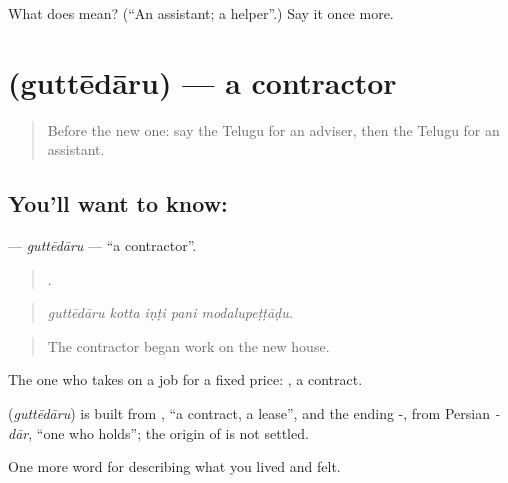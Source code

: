 \begin{tcolorbox}[breakable,colback=teal!4,colframe=teal!35!black,title={Before you move on}]
What does  mean? (\textquotedblleft{}An assistant; a helper\textquotedblright{}.) Say it once more.
\end{tcolorbox}
\section[\texorpdfstring{\te{గుత్తేదారు} (guttēdāru)}{గుత్తేదారు (guttēdāru)}]{ (guttēdāru) — a contractor}

\label{lesson:TE-C523-guttedaru}



\begin{quote}
Before the new one: say the Telugu for an adviser, then the Telugu for an assistant.
\end{quote}

\subsection*{You'll want to know: }
\textbf{} — \emph{guttēdāru} — \textquotedblleft{}a contractor\textquotedblright{}.

\begin{quote}
    .
\end{quote}

\begin{quote}
\emph{guttēdāru kotta iṇṭi pani modalupeṭṭāḍu.}
\end{quote}

\begin{quote}
The contractor began work on the new house.
\end{quote}

The one who takes on a job for a fixed price: , a contract.

\begin{cousinweb}
\textbf{} (\emph{guttēdāru}) is built from , \textquotedblleft{}a contract, a lease\textquotedblright{}, and the ending -, from Persian \emph{-dār}, \textquotedblleft{}one who holds\textquotedblright{}; the origin of  is not settled.
\end{cousinweb}

\begin{grammarlens}[title={What you've built}]
One more word for describing what you lived and felt.
\end{grammarlens}

